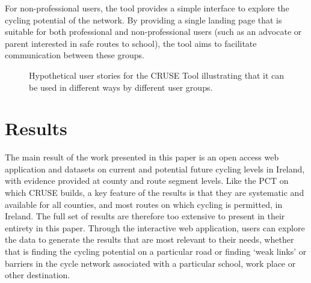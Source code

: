 \documentclass[
  super,
  preprint,
  3p]{elsarticle}
\begin{document}
For non-professional users, the tool provides a simple interface to
explore the cycling potential of the network. By providing a single
landing page that is suitable for both professional and non-professional
users (such as an advocate or parent interested in safe routes to
school), the tool aims to facilitate communication between these groups.

\begin{figure}


\caption{\label{fig-user-stories}Hypothetical user stories for the CRUSE
Tool illustrating that it can be used in different ways by different
user groups.}

\end{figure}%

\section{Results}\label{sec-results}

The main result of the work presented in this paper is an open access
web application and datasets on current and potential future cycling
levels in Ireland, with evidence provided at county and route segment
levels. Like the PCT on which CRUSE builds, a key feature of the results
is that they are systematic and available for all counties, and most
routes on which cycling is permitted, in Ireland. The full set of
results are therefore too extensive to present in their entirety in this
paper. Through the interactive web application, users can explore the
data to generate the results that are most relevant to their needs,
whether that is finding the cycling potential on a particular road or
finding `weak links' or barriers in the cycle network associated with a
particular school, work place or other destination.
\end{document}
